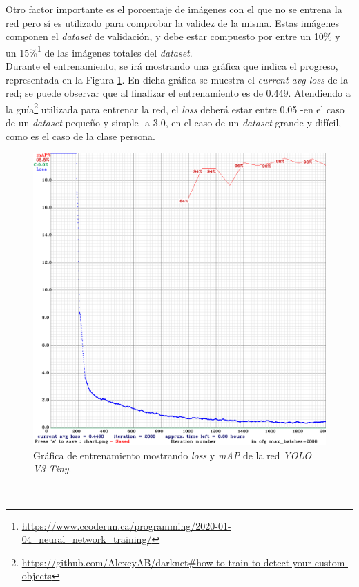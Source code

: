 Otro factor importante es el porcentaje de imágenes con el que no se entrena la red pero sí es utilizado para comprobar la validez de la misma. Estas imágenes componen el \textit{dataset} de validación, y debe estar compuesto por entre un 10\% y un 15\%\footnote{\url{https://www.ccoderun.ca/programming/2020-01-04_neural_network_training/}} de las imágenes totales del \textit{dataset}.\\

Durante el entrenamiento, se irá mostrando una gráfica que indica el progreso, representada en la Figura \ref{fig:chart}. En dicha gráfica se muestra el \textit{current avg loss} de la red; se puede observar que al finalizar el entrenamiento es de 0.449. Atendiendo a la guía\footnote{\url{https://github.com/AlexeyAB/darknet\#how-to-train-to-detect-your-custom-objects}} utilizada para entrenar la red, el \textit{loss} deberá estar entre 0.05 -en el caso de un \textit{dataset} pequeño y simple- a 3.0, en el caso de un \textit{dataset} grande y difícil, como es el caso de la clase persona.\\

\begin{figure} [h!]
	\begin{center}
		\includegraphics[width=12cm]{figs/chart}
	\end{center}
	\caption{Gráfica de entrenamiento mostrando \textit{loss} y \textit{mAP} de la red \textit{YOLO V3 Tiny}.}
	\label{fig:chart}
\end{figure}\

